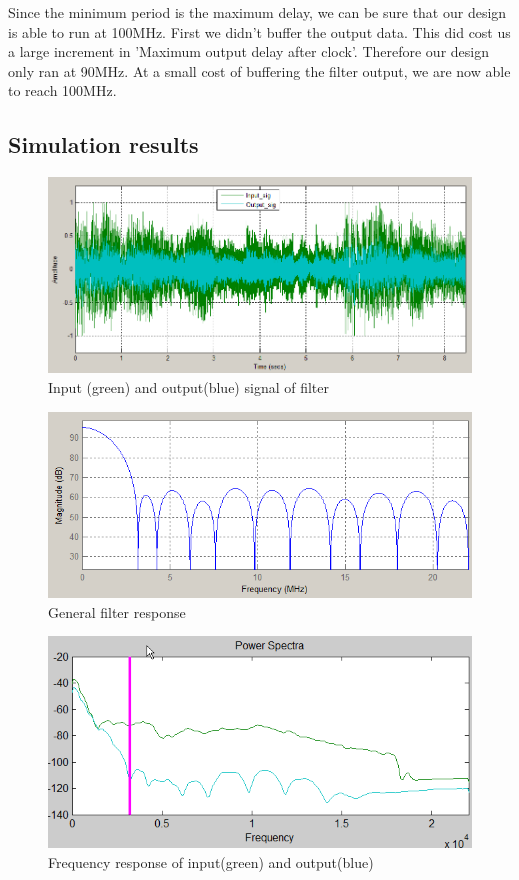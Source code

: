 \documentclass[a4paper,twoside,11pt, fleqn]{article}
\begin{document}
Since the minimum period is the maximum delay, we can be sure that our design is able to run at 100MHz. First we didn't buffer the output data. This did cost us a large increment in 'Maximum output delay after clock'. Therefore our design only ran at 90MHz. At a small cost of buffering the filter output, we are now able to reach 100MHz.

\subsection{Simulation results}
\begin{figure}[h]
	\includegraphics[scale = 0.71]{Images/3a_timedomain_inputoutput}
    \caption{Input (green) and output(blue) signal of filter}
\end{figure}

\begin{figure}[h]
	\includegraphics[scale = 1]{Images/3a_filterrespons}
    \caption{General filter response}
\end{figure}

\begin{figure}[h]
	\includegraphics[scale = 1]{Images/3a_powerspectra}
    \caption{Frequency response of input(green) and output(blue)}
\end{figure}
\end{document}
